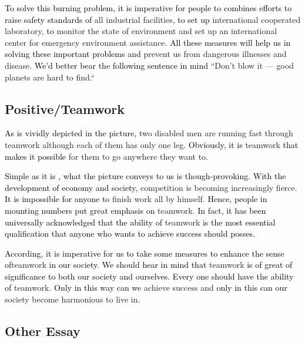 \documentclass{article}
\begin{document}
\par \textcolor{black}{To solve this burning problem, it is imperative for people to
  combines efforts to raise safety standards of} all industrial facilities,
\textcolor{black}{to set up} international cooperated laboratory, \textcolor{black}{to}
monitor the state of environment and set up an international center for emergency
environment assistance. \textcolor{black}{All these measures will help us in solving these
  important problems and} prevent us from dangerous illnesses and
disease. \textcolor{black}{We'd better bear the following sentence in mind} ``Don't blow it
--- good planets are hard to find.``

\subsection{Positive/Teamwork}
\label{sec:positive}

\hspace{0.5cm} \textcolor{black}{As is vividly depicted in the picture,} two disabled men
are running fast through teamwork although each of them has only one
leg. \textcolor{black}{Obviously}, \textcolor{black}{it is }teamwork \textcolor{black}{that
  makes it possible }for them to go anywhere they want to.

\par \textcolor{black}{Simple as it is , what the picture conveys to us is
  though-provoking. } \textcolor{black}{With the development of economy and society,
}competition is becoming increasingly fierce. \textcolor{black}{It is impossible for anyone
  to }finish work all by himself. \textcolor{black}{Hence, people in mounting numbers put great
  emphasis on }teamwork. \textcolor{black}{In fact, it has been universally acknowledged that
  the ability of }teamwork \textcolor{black}{is the most essential qualification that anyone
  who wants to achieve success should posses}.

\par \textcolor{black}{According, it is imperative for us to take some measures to enhance
  the sense of}teamwork \textcolor{black}{in our society}. \textcolor{black}{We should hear in mind that
}teamwork \textcolor{black}{is of great of significance to both our society and ourselves.}
\textcolor{black}{Every one should have the ability of }teamwork. \textcolor{black}{Only in this
  way can we }achieve success and \textcolor{black}{only in this can our} society become harmonious to live in.

\subsection{Other Essay}
\label{sec:other-essay}
\end{document}
